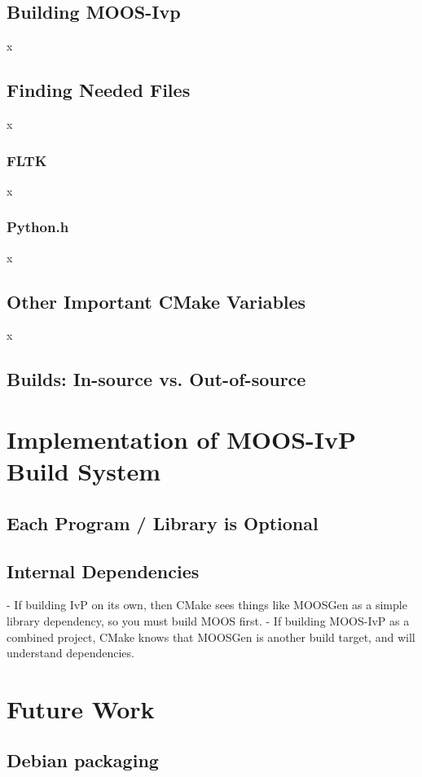 \documentclass[letterpaper,10pt]{article}
\begin{document}
\subsection{Building MOOS-Ivp}
x

\subsection{Finding Needed Files}
x

\subsubsection{FLTK}
x

\subsubsection{Python.h}
x

\subsection{Other Important CMake Variables}
x
\subsection{Builds: In-source vs. Out-of-source}

\section{Implementation of MOOS-IvP Build System }
\subsection{Each Program / Library is Optional}
\subsection{Internal Dependencies}
- If building IvP on its own, then CMake sees things like MOOSGen as
a simple library dependency, so you must build MOOS first.
- If building MOOS-IvP as a combined project, CMake knows that MOOSGen
is another build target, and will understand dependencies.

\section{Future Work}


\subsection{Debian packaging}
\end{document}
